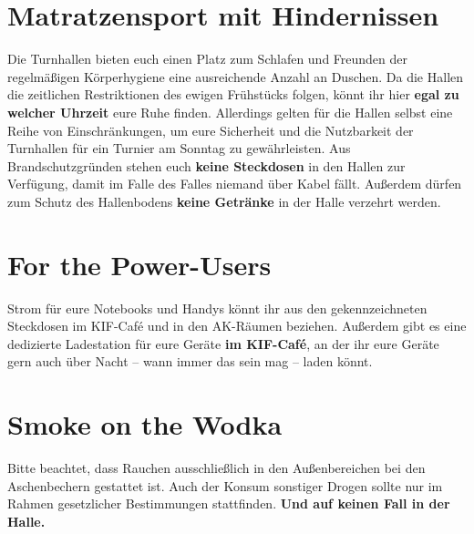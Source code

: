 \section*{Matratzensport mit Hindernissen}

Die Turnhallen bieten euch einen Platz zum Schlafen und Freunden der regelmäßigen Körperhygiene eine ausreichende Anzahl an Duschen.
Da die Hallen die zeitlichen Restriktionen des ewigen Frühstücks folgen, könnt ihr hier \textbf{egal zu welcher Uhrzeit} eure Ruhe finden.
Allerdings gelten für die Hallen selbst eine Reihe von Einschränkungen, um eure Sicherheit und die Nutzbarkeit der Turnhallen für ein Turnier am Sonntag zu gewährleisten.
Aus Brandschutzgründen stehen euch \textbf{keine Steckdosen} in den Hallen zur Verfügung, damit im Falle des Falles niemand über Kabel fällt.
Außerdem dürfen zum Schutz des Hallenbodens \textbf{keine Getränke} in der Halle verzehrt werden.

\section*{For the Power-Users}

Strom für eure Notebooks und Handys könnt ihr aus den gekennzeichneten Steckdosen im KIF-Café und in den AK-Räumen beziehen.
Außerdem gibt es eine dedizierte Ladestation für eure Geräte \textbf{im KIF-Café}, an der ihr eure Geräte gern auch über Nacht -- wann immer das sein mag -- laden könnt.

\section*{Smoke on the Wodka}

Bitte beachtet, dass Rauchen ausschließlich in den Außenbereichen bei den Aschenbechern gestattet ist.
Auch der Konsum sonstiger Drogen sollte nur im Rahmen gesetzlicher Bestimmungen stattfinden. \textbf{Und auf keinen Fall in der Halle.}

